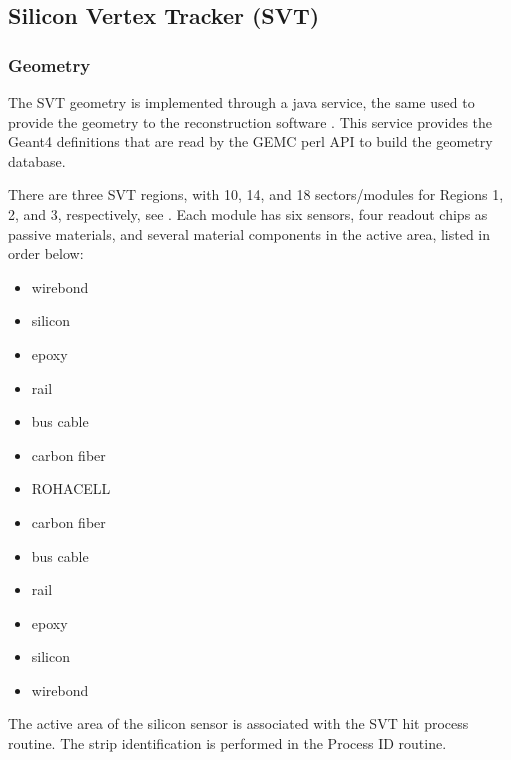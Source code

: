 \subsection{Silicon Vertex Tracker (SVT)}


\subsubsection{Geometry}


The SVT \cite{svt-nim} geometry is implemented through a java service, the same used to provide the geometry
to the reconstruction software \cite{recon-nim}.
This service provides the Geant4 definitions that are read by the GEMC perl API to build the geometry database.

There are three SVT regions, with 10, 14, and 18 sectors/modules for Regions 1, 2, and 3, respectively, see .
Each module has six sensors, four readout chips as passive materials, and several material
components in the active area, listed in order below:

\begin{itemize}
	\item wirebond
	\item silicon
	\item epoxy
	\item rail
	\item bus cable
	\item carbon fiber
	\item ROHACELL
	\item carbon fiber
	\item bus cable
	\item rail
	\item epoxy
	\item silicon
	\item wirebond
\end{itemize}

The active area of the silicon sensor is associated with the SVT hit process routine.
The strip identification is performed in the Process ID routine.


